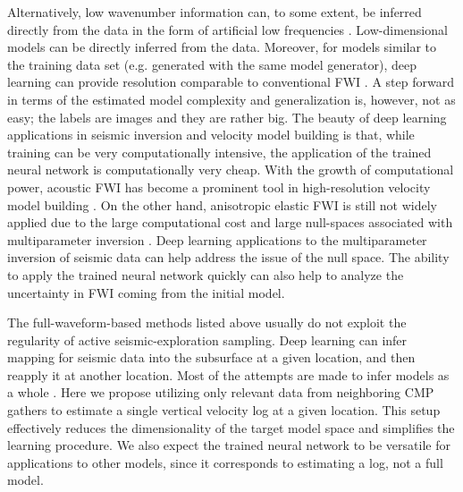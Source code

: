 \documentclass[paper,twocolomn]{geophysics}
\begin{document}
Alternatively, low wavenumber information can, to some extent, be inferred directly from the data in the form of artificial low frequencies \citep{ovcharenkoNeuralNetworkBased2017, ovcharenkoLowFrequencyDataExtrapolation2018, ovcharenko2019deep, jin2018learn, sunLowFrequencyExtrapolation2018, sun2019extrapolated, kazei2019realistically}. Low-dimensional models \citep[e.g.][]{polo2018, wu2018inversionnet} can be directly inferred from the data. Moreover, for models similar to the training data set (e.g. generated with the same model generator), deep learning can provide resolution comparable to conventional FWI \citep{farris2018tomography, araya2020fast}. A step forward in terms of the estimated model complexity and generalization is, however, not as easy; the labels are images and they are rather big. The beauty of deep learning applications in seismic inversion and velocity model building is that, while training can be very computationally intensive, the application of the trained neural network is computationally very cheap. With the growth of computational power, acoustic FWI has become a prominent tool in high-resolution velocity model building \citep[e.g.][]{warner2013}. On the other hand, anisotropic elastic FWI is still not widely applied due to the large computational cost and large null-spaces associated with multiparameter inversion \citep{kohn2015,kazei2018,kazei2019scattering, podgornovaResolutionVTIAnisotropy2018}. Deep learning applications to the multiparameter inversion of seismic data \citep{ivanov2017traveltime, dramsch2019deep, zhang2019regularized} can help address the issue of the null space.
The ability to apply the trained neural network quickly can also help to analyze the uncertainty in FWI coming from the initial model.



The full-waveform-based methods listed above usually do not exploit the regularity of active seismic-exploration sampling. Deep learning can infer mapping for seismic data into the subsurface at a given location, and then reapply it at another location. Most of the attempts are made to infer models as a whole \citep{richardson2018seismic, wu2018inversionnet, zhang2018velocitygan, yang2019deep, oye2019velocity, farris2018tomography, araya2019deep, araya2020fast}. Here we propose utilizing only relevant data from neighboring CMP gathers to estimate a single vertical velocity log at a given location. This setup effectively reduces the dimensionality of the target model space and simplifies the learning procedure. We also expect the trained neural network to be versatile for applications to other models, since it corresponds to estimating a log, not a full model.
\end{document}

